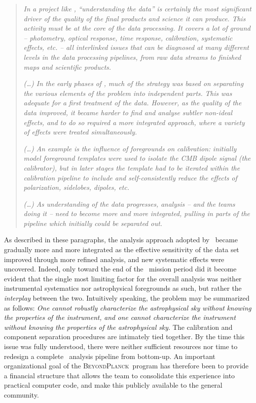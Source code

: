\documentclass[onecolumn]{aa}
\newcommand{\BP}{\textsc{BeyondPlanck}}
\begin{document}
\begin{quotation}
\emph{In a project like \Planck, ``understanding the data'' is
  certainly the most significant driver of the quality of the final
  products and science it can produce. This activity must be at the
  core of the data processing. It covers a lot of ground --
  photometry, optical response, time response, calibration, systematic
  effects, etc. -- all interlinked issues that can be diagnosed at
  many different levels in the data processing pipelines, from raw
  data streams to finished maps and scientific products.}

\emph{(\ldots) In the early phases of \Planck, much of the strategy was based on
  separating the various elements of the problem into independent
  parts. This was adequate for a first treatment of the data.
  However, as the quality of the data improved, it became harder to
  find and analyse subtler non-ideal effects, and to do so required a
  more integrated approach, where a variety of effects were treated
  simultaneously.}

\emph{(\ldots) An example is the influence of foregrounds on
  calibration: initially model foreground templates were used to
  isolate the CMB dipole signal (the calibrator), but in later stages
  the template had to be iterated within the calibration pipeline to
  include and self-consistently reduce the effects of polarization,
  sidelobes, dipoles, etc.}

\emph{(\ldots) As understanding of the data progresses, analysis --
  and the teams doing it -- need to become more and more integrated,
  pulling in parts of the pipeline which initially could be separated
  out.}
\end{quotation}

As described in these paragraphs, the analysis approach adopted by
\Planck\ became gradually more and more integrated as the effective
sensitivity of the data set improved through more refined analysis,
and new systematic effects were uncovered. Indeed, only toward the end
of the \Planck\ mission period did it become evident that the single
most limiting factor for the overall analysis was neither instrumental
systematics nor astrophysical foregrounds as such, but rather the
\emph{interplay} between the two. Intuitively speaking, the problem
may be summarized as follows: \emph{One cannot robustly characterize
  the astrophysical sky without knowing the properties of the
  instrument, and one cannot characterize the instrument without
  knowing the properties of the astrophysical sky.}  The calibration
and component separation procedures are intimately tied together. By
the time this issue was fully understood, there were neither
sufficient resources nor time to redesign a complete \Planck\ analysis
pipeline from bottom-up. An important organizational goal of the
\BP\ program has therefore been to provide a financial structure that
allows the team to consolidate this experience into practical computer
code, and make this publicly available to the general community.
\end{document}
